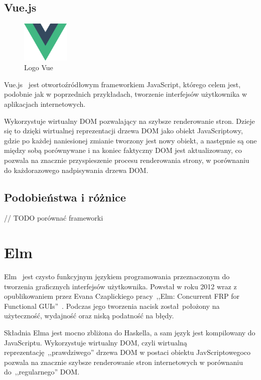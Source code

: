 \documentclass[twoside,a4paper]{report}
\begin{document}
\section{Vue.js}
\begin{figure}
    \centering
    \includegraphics[width=0.2\textwidth]{img/logo_vue.png}
    \caption*{Logo Vue}\label{fig:logo_vue}
\end{figure}
Vue.js~\cite{vuejsdocs} jest otwortoźródłowym frameworkiem JavaScript, którego celem jest, podobnie jak w poprzednich przykładach, tworzenie interfejsów użytkownika w aplikacjach internetowych.

Wykorzystuje wirtualny DOM pozwalający na szybsze renderowanie stron.
Dzieje się to dzięki wirtualnej reprezentacji drzewa DOM jako obiekt JavaScriptowy, gdzie po każdej naniesionej zmianie tworzony jest nowy obiekt, a następnie są one między sobą porównywane i na koniec faktyczny DOM jest aktualizowany, co pozwala na znacznie przyspieszenie procesu renderowania strony, w porównaniu do każdorazowego nadpisywania drzewa DOM\@.

\section{Podobieństwa i różnice}

// TODO porównać frameworki


\chapter{Elm}
Elm~\cite{elmdocs} jest czysto funkcyjnym językiem programowania przeznaczonym do tworzenia graficznych interfejsów użytkownika.
Powstał w roku 2012 wraz z opublikowaniem przez Evana Czaplickiego pracy~,,Elm: Concurrent FRP for Functional GUIs''~\cite{Czaplicki2012ElmC}.
Podczas jego tworzenia nacisk został położony na użyteczność, wydajność oraz niską podatność na błędy.

Składnia Elma jest mocno zbliżona do Haskella, a sam język jest kompilowany do JavaScriptu.
Wykorzystuje wirtualny DOM, czyli wirtualną reprezentację~,,prawdziwego'' drzewa DOM w postaci obiektu JavScriptowegoco pozwala na znacznie szybsze renderowanie stron internetowych w porównaniu do~,,regularnego'' DOM\@.
\end{document}
